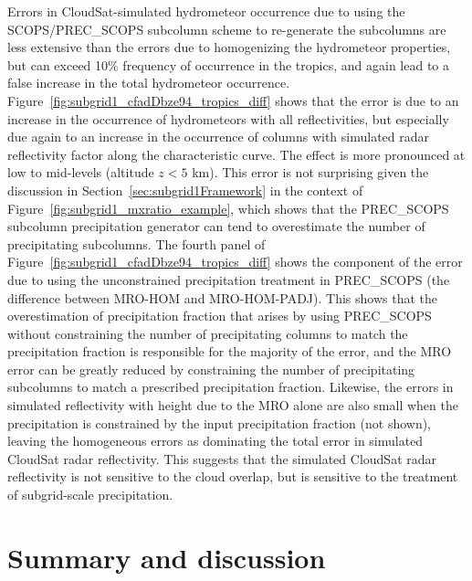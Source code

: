 Errors in CloudSat-simulated hydrometeor occurrence due to using the
SCOPS/PREC\_SCOPS subcolumn scheme to re-generate the subcolumns are
less extensive than the errors due to homogenizing the hydrometeor
properties, but can exceed 10\% frequency of occurrence in the tropics,
and again lead to a false increase in the total hydrometeor occurrence.
Figure~\ref{fig:subgrid1_cfadDbze94_tropics_diff} shows that the error
is due to an increase in the occurrence of hydrometeors with all
reflectivities, but especially due again to an increase in the
occurrence of columns with simulated radar reflectivity factor along the
characteristic curve. The effect is more pronounced at low to mid-levels
(altitude \(z < 5\) km). This error is not surprising given the
discussion in Section~\ref{sec:subgrid1Framework} in the context of
Figure~\ref{fig:subgrid1_mxratio_example}, which shows that the
PREC\_SCOPS subcolumn precipitation generator can tend to overestimate
the number of precipitating subcolumns. The fourth panel of
Figure~\ref{fig:subgrid1_cfadDbze94_tropics_diff} shows the component of
the error due to using the unconstrained precipitation treatment in
PREC\_SCOPS (the difference between MRO-HOM and MRO-HOM-PADJ). This
shows that the overestimation of precipitation fraction that arises by
using PREC\_SCOPS without constraining the number of precipitating
columns to match the precipitation fraction is responsible for the
majority of the error, and the MRO error can be greatly reduced by
constraining the number of precipitating subcolumns to match a
prescribed precipitation fraction. Likewise, the errors in simulated
reflectivity with height due to the MRO alone are also small when the
precipitation is constrained by the input precipitation fraction (not
shown), leaving the homogeneous errors as dominating the total error in
simulated CloudSat radar reflectivity. This suggests that the simulated
CloudSat radar reflectivity is not sensitive to the cloud overlap, but
is sensitive to the treatment of subgrid-scale precipitation.

\section{Summary and discussion}\label{sec:subgrid1Summary}

